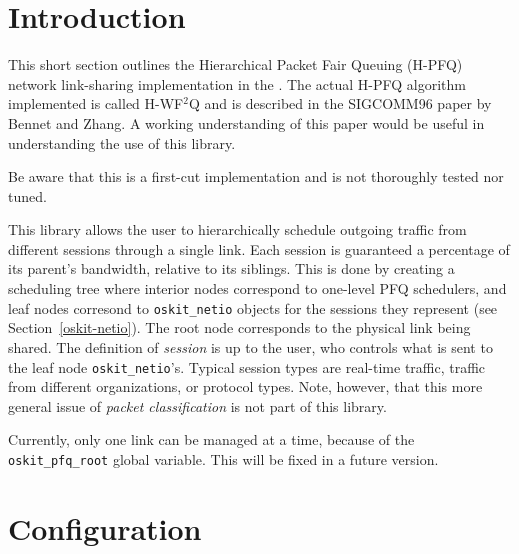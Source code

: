 %
% 
%
\label{hpfq}

\newcommand{\hpfq}{H-PFQ}


\section{Introduction}

This short section outlines the Hierarchical Packet Fair Queuing
(\hpfq) network link-sharing implementation in the \oskit.
The actual \hpfq{} algorithm implemented is called H-WF$^2$Q and is
described in the SIGCOMM96 paper by Bennet and Zhang.
A working understanding of this paper would be useful in understanding
the use of this library.

Be aware that this is a first-cut implementation and is not thoroughly
tested nor tuned.

This library allows the user to hierarchically schedule outgoing
traffic from different sessions through a single link.
Each session is guaranteed a percentage of its parent's bandwidth,
relative to its siblings.
This is done by creating a scheduling tree where interior nodes
correspond to one-level PFQ schedulers,
and leaf nodes corresond to \texttt{oskit_netio} objects for the
sessions they represent (see Section~\ref{oskit-netio}).
The root node corresponds to the physical link being shared.
The definition of \emph{session} is up to the user,
who controls what is sent to the leaf node \texttt{oskit_netio}'s.
Typical session types are real-time traffic,
traffic from different organizations,
or protocol types.
Note, however, that this more general issue of \emph{packet classification}
is not part of this library.

Currently, only one link can be managed at a time,
because of the \texttt{oskit_pfq_root} global variable.
This will be fixed in a future version.


\section{Configuration}

